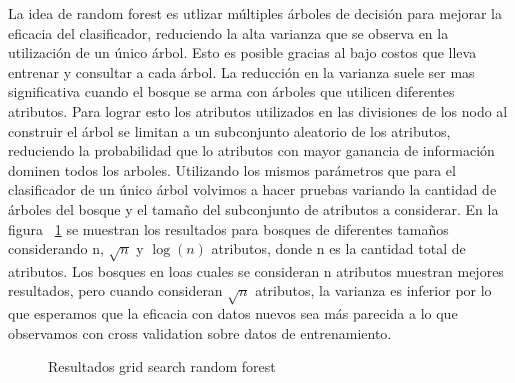 
La idea de random forest es utlizar múltiples árboles de decisión para mejorar la eficacia del clasificador, reduciendo la alta varianza que se observa en la utilización de un único árbol. Esto es posible gracias al bajo costos que lleva entrenar y consultar a cada árbol. 
 La reducción en la varianza suele ser mas significativa cuando el bosque se arma con árboles que utilicen diferentes atributos. Para lograr esto los atributos utilizados en las divisiones de los nodo al construir el árbol se limitan a un subconjunto aleatorio de los atributos, reduciendo la probabilidad que lo atributos con mayor ganancia de información dominen todos los arboles. 
Utilizando los mismos parámetros que para el clasificador de un único árbol volvimos a hacer pruebas variando la cantidad de árboles del bosque y el tamaño del subconjunto de atributos a considerar. En la figura ~\ref{fig:forest_f05_en_funcion_de_cantidad_de_arboles} se muestran los resultados para bosques de diferentes tamaños considerando n, $\sqrt{n}$ y $\log(n)$ atributos, donde n es la cantidad total de atributos. Los bosques en loas cuales se consideran n atributos muestran mejores resultados, pero cuando consideran $\sqrt{n}$ atributos,  la varianza es inferior por lo que esperamos que la eficacia con datos nuevos sea más parecida a lo  que observamos con cross validation sobre datos de entrenamiento. 

\begin{figure}[H]
\begin{center}
\caption{Resultados grid search random forest}
\label{fig:forest_f05_en_funcion_de_cantidad_de_arboles}
\end{center}
\end{figure}